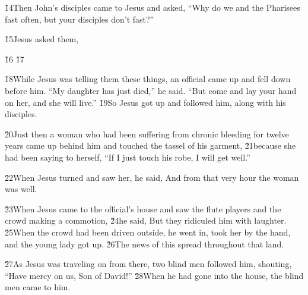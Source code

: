 \v{14}Then John's disciples came to Jesus and asked, ``Why do we and the Pharisees fast often, but your disciples don't fast?''

\v{15}Jesus asked them, 

\v{16} \v{17}

\v{18}While Jesus was telling them these things, an official came up and fell down before him. ``My daughter has just died,'' he said. ``But come and lay your hand on her, and she will live.'' \v{19}So Jesus got up and followed him, along with his disciples.

\v{20}Just then a woman who had been suffering from chronic bleeding for twelve years came up behind him and touched the tassel of his garment, \v{21}because she had been saying to herself, ``If I just touch his robe, I will get well.''

\v{22}When Jesus turned and saw her, he said,  And from that very hour the woman was well.

\v{23}When Jesus came to the official's house and saw the flute players and the crowd making a commotion, \v{24}he said,  But they ridiculed him with laughter. \v{25}When the crowd had been driven outside, he went in, took her by the hand, and the young lady got up. \v{26}The news of this spread throughout that land.

\v{27}As Jesus was traveling on from there, two blind men followed him, shouting, ``Have mercy on us, Son of David!'' \v{28}When he had gone into the house, the blind men came to him.

